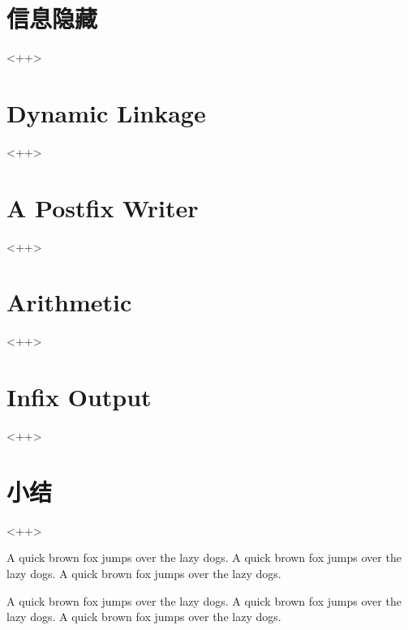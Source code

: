 \section{信息隐藏}<++>

\section{Dynamic Linkage}<++>

\section{A Postfix Writer}<++>

\section{Arithmetic}<++>

\section{Infix Output}<++>

\section{小结}<++>

A quick brown fox jumps over the lazy dogs.
A quick brown fox jumps over the lazy dogs.
A quick brown fox jumps over the lazy dogs.

A quick brown fox jumps over the lazy dogs.
A quick brown fox jumps over the lazy dogs.
A quick brown fox jumps over the lazy dogs.


